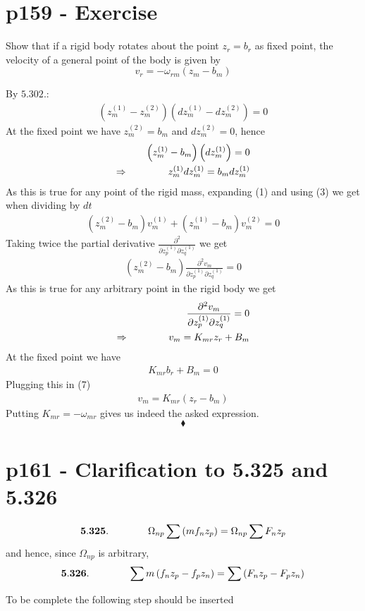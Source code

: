 \section{p159 - Exercise}
\begin{tcolorbox}
Show that if a rigid body rotates about the point $z_r=b_r$ as fixed point, the velocity of a general point of the body is given by $$v_r=-\omega_{rm}\left(z_m-b_m\right)$$
\end{tcolorbox}
By $\mathbf{5.302. }$:
\begin{align}
\left(z^{(1)}_m-z^{(2)}_m\right)\left(dz^{(1)}_m-dz^{(2)}_m\right)=0
\end{align}
At the fixed point we have $z^{(2)}_m=b_m$ and $dz^{(2)}_m=0$, hence
\begin{align}
\left(z^{(1)}_m-b_m\right)\left(dz^{(1)}_m\right)=0\\
\Rightarrow\quad\quad\quad\quad z^{(1)}_mdz^{(1)}_m =b_mdz^{(1)}_m
\end{align}
As this is true for any point of the rigid mass, expanding (1) and using (3) we get when dividing by $dt$
\begin{align}
\left(z^{(2)}_m-b_m\right)v^{(1)}_m+\left(z^{(1)}_m-b_m\right)v^{(2)}_m=0
\end{align}
Taking twice the partial derivative $\frac{\partial^2}{\partial z^{(1)}_p\partial z^{(1)}_q}$ we get
\begin{align}
\left(z^{(2)}_m-b_m\right)\frac{\partial^2 v_m}{\partial z^{(1)}_p\partial z^{(1)}_q}=0
\end{align}
As this is true for any arbitrary point in the rigid body we get
\begin{align}
\frac{\partial^2 v_m}{\partial z^{(1)}_p\partial z^{(1)}_q}=0\\
\Rightarrow\quad\quad\quad\quad v_m= K_{mr}z_r+B_m
\end{align}
At the fixed point we have 
\begin{align}
 K_{mr}b_r+B_m =0
\end{align}
Plugging this in (7)
\begin{align}
 v_m= K_{mr}\left(z_r-b_m\right)
\end{align}
Putting $K_{mr}=-\omega_{mr}$ gives us indeed the asked expression.
$$\blacklozenge$$
\newpage


\section{p161 - Clarification to 5.325 and 5.326}
\begin{tcolorbox}
$$\mathbf{5.325.}\quad\quad\quad\quad \Omega_{np}\sum \left(mf_nz_p\right)= \Omega_{np}\sum F_nz_p $$
and hence, since $\Omega_{np}$ is arbitrary,
$$\mathbf{5.326.}\quad\quad\quad\quad \sum m\left(f_nz_p-f_pz_n\right)= \sum \left(F_nz_p-F_pz_n \right)$$
\end{tcolorbox}
To be complete the following step should be inserted

